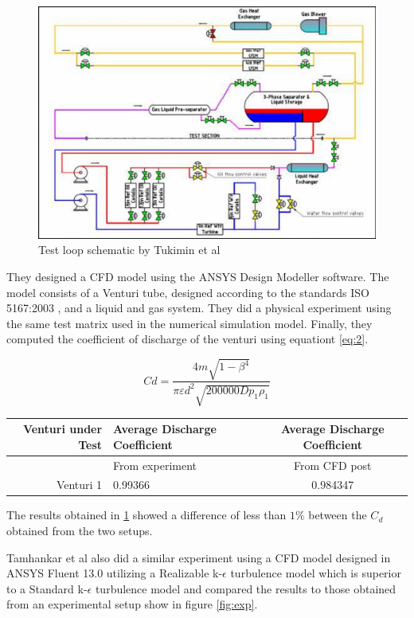 \begin{figure}[ht]
\includegraphics[width=0.9\linewidth]{Figures/test_loop.png}
\centering
\caption[Test loop schematic]{ Test loop schematic by Tukimin et al \cite{tukimin2016cfd}}
\label{fig:test_loop_rig}
\end{figure}

They designed a CFD model using the ANSYS Design Modeller software. The model consists of a Venturi tube, designed according to the standards ISO 5167:2003 \cite{carello2013flow}, and a liquid and gas system. They did a physical experiment using the same test matrix used in the numerical simulation model. Finally, they computed the coefficient of discharge of the venturi using equationt \ref{eq:2}.  

\begin{equation}
C d=\frac{4 m \sqrt{1-\beta^{4}}}{\pi \varepsilon d^{2} \sqrt{200000 D p_{1} \rho_{1}}}
\label{eq:2}
\end{equation}

\begin{table}[!t]
  \begin{center}
    \leavevmode
     \begin{tabular}{rlc}\hline
      Venturi under Test & Average Discharge Coefficient &  Average Discharge Coefficient \\ \hline
       & From experiment &  From CFD post \\ \hline
      Venturi 1 & 0.99366 &  0.984347 \\ \hline
    \end{tabular}
    \label{tab:cd}
  \end{center}
\end{table}
The results obtained in \ref{tab:cd} showed a difference of less than $1 \%$ between the $C_{d}$ obtained from the two setups.
\par
Tamhankar et al \cite{tamhankar2014experimental} also did a similar experiment using a CFD model designed in ANSYS Fluent 13.0 utilizing a Realizable k-$\epsilon$ turbulence model which is superior to a Standard k-$\epsilon$ turbulence model and compared the results to those obtained from an experimental setup show in figure \ref{fig:exp}. 


